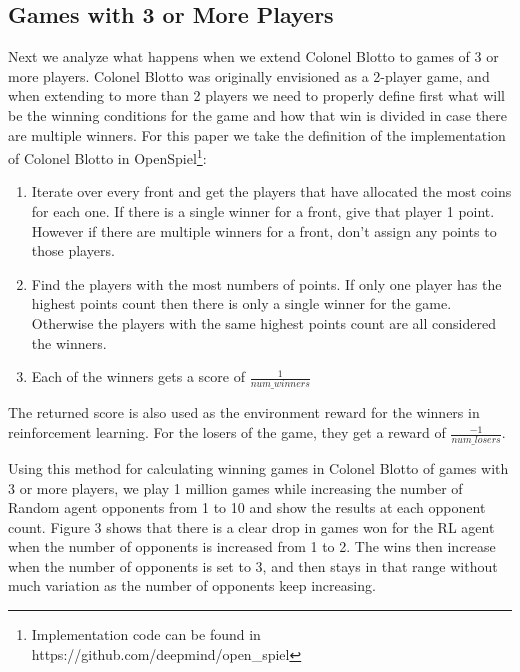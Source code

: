 \documentclass[11pt, oneside]{article}   	%
\begin{document}
\subsection{Games with 3 or More Players}

Next we analyze what happens when we extend Colonel Blotto to games of 3 or more players. Colonel Blotto was originally envisioned as a 2-player game, and when extending to more than 2 players we need to properly define first what will be the winning conditions for the game and how that win is divided in case there are multiple winners. For this paper we take the definition of the implementation of Colonel Blotto in OpenSpiel\footnote{Implementation code can be found in https://github.com/deepmind/open\_spiel}:

\begin{enumerate}
  \item Iterate over every front and get the players that have allocated the most coins for each one. If there is a single winner for a front, give that player 1 point. However if there are multiple winners for a front, don't assign any points to those players.
  \item Find the players with the most numbers of points. If only one player has the highest points count then there is only a single winner for the game. Otherwise the players with the same highest points count are all considered the winners.
  \item Each of the winners gets a score of $\frac{1}{num\_winners}$    %
\end{enumerate}

The returned score is also used as the environment reward for the winners in reinforcement learning. For the losers of the game, they get a reward of $\frac{-1}{num\_losers}$.

\hfill

Using this method for calculating winning games in Colonel Blotto of games with 3 or more players, we play 1 million games while increasing the number of Random agent opponents from 1 to 10 and show the results at each opponent count. Figure 3 shows that there is a clear drop in games won for the RL agent when the number of opponents is increased from 1 to 2. The wins then increase when the number of opponents is set to 3, and then stays in that range without much variation as the number of opponents keep increasing. 

\hfill
\end{document}
